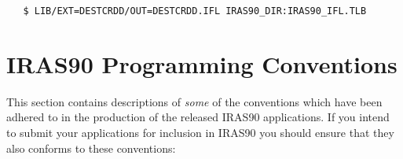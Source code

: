 \small
\begin{verbatim}
   $ LIB/EXT=DESTCRDD/OUT=DESTCRDD.IFL IRAS90_DIR:IRAS90_IFL.TLB
\end{verbatim}
\normalsize

\section{IRAS90 Programming Conventions
\label{SEC:CONV}}

This section contains descriptions of {\em some} of the conventions
which have been adhered to in the production of the released {\small
IRAS90} applications.  If you intend to submit your applications for
inclusion in {\small IRAS90} you should ensure that they also conforms
to these conventions:

